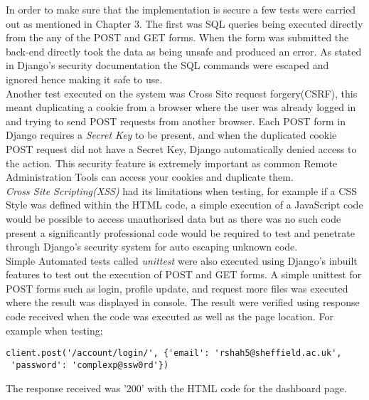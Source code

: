 \documentclass[../main.tex]{subfiles}
\begin{document}
\raggedright
In order to make sure that the implementation is secure a few tests were carried out as mentioned in Chapter 3. The first was SQL queries being executed directly from the any of the POST and GET forms. When the form was submitted the back-end directly took the data as being unsafe and produced an error. As stated in Django's security documentation\cite{djangoSecurity} the SQL commands were escaped and ignored hence making it safe to use. \\[4mm]

Another test executed on the system was Cross Site request forgery(CSRF), this meant duplicating a cookie from a browser where the user was already logged in and trying to send POST requests from another browser. Each POST form in Django requires a \textit{Secret Key} to be present, and when the duplicated cookie POST request did not have a Secret Key, Django automatically denied access to the action. This security feature is extremely important as common Remote Administration Tools can access your cookies and duplicate them. \\[4mm]

\textit{Cross Site Scripting(XSS)} had its limitations when testing, for example if a CSS Style was defined within the HTML code, a simple execution of a JavaScript code would be possible to access unauthorised data but as there was no such code present a significantly professional code would be required to test and penetrate through Django's security system for auto escaping unknown code. \\[4mm]

Simple Automated tests called \textit{unittest} were also executed using Django's inbuilt features to test out the execution of POST and GET forms. A simple unittest for POST forms such as login, profile update, and request more files was executed where the result was displayed in console. The result were verified using response code received when the code was executed as well as the page location. For example when testing; \\
\begin{verbatim}
client.post('/account/login/', {'email': 'rshah5@sheffield.ac.uk',
 'password': 'complexp@ssw0rd'}) 
\end{verbatim}
The response received was '200' with the HTML code for the dashboard page. \\[4mm]
\end{document}
